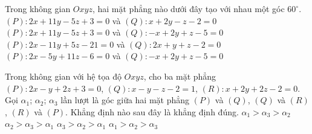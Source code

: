 \begin{ex}%
	Trong không gian $Oxyz$, hai mặt phẳng nào dưới đây tạo với nhau một góc $60^\circ$.
	\choice
	{$(P)\colon 2x+11y-5z+3=0$ và $(Q)\colon x+2y-z-2=0$}
	{\True $(P)\colon 2x+11y-5z+3=0$ và $(Q)\colon-x+2y+z-5=0$}
	{$(P)\colon 2x-11y+5z-21=0$ và $(Q)\colon 2x+y+z-2=0$}
	{$(P)\colon 2x-5y+11z-6=0$ và $(Q)\colon -x+2y+z-5=0$}
\end{ex}
\begin{ex}%
	Trong không gian với hệ tọa độ $Oxyz$, cho ba mặt phẳng $(P)\colon 2x-y+2z+3=0$, $(Q)\colon x-y-z-2=1$, $(R)\colon x+2y+2z-2=0$. Gọi $\alpha _1$; $\alpha _2$; $\alpha _3$ lần lượt là góc giữa hai mặt phẳng $(P)$ và $(Q)$, $(Q)$ và $(R)$, $(R)$ và $(P)$. Khẳng định nào sau đây là khẳng định đúng.
	\choice
	{\True $\alpha _1>\alpha _3>\alpha _2$}
	{$\alpha _2>\alpha _3>\alpha _1$}
	{$\alpha _3>\alpha _2>\alpha _1$}
	{$\alpha _1>\alpha _2>\alpha _3$}
\end{ex}
